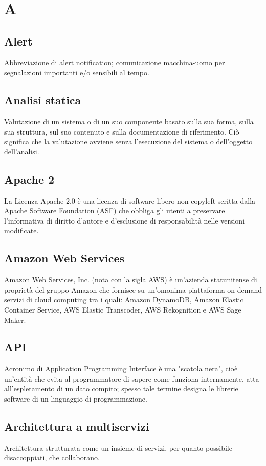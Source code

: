 \section*{A}
\subsection*{Alert}
Abbreviazione di alert notification; comunicazione macchina-uomo per segnalazioni importanti e/o sensibili al tempo.

\subsection*{Analisi statica}
Valutazione di un sistema o di un suo componente basato sulla sua forma, sulla sua struttura, sul suo contenuto e sulla documentazione di riferimento. Ciò significa che la valutazione avviene senza l'esecuzione del sistema o dell'oggetto dell'analisi.

\subsection*{Apache 2}
La Licenza Apache 2.0 è una licenza di software libero non copyleft scritta dalla Apache Software Foundation (ASF) che obbliga gli utenti a preservare l'informativa di diritto d'autore e d'esclusione di responsabilità nelle versioni modificate. 

\subsection*{Amazon Web Services}
Amazon Web Services, Inc. (nota con la sigla AWS) è un'azienda statunitense di proprietà del gruppo Amazon che fornisce su un'omonima piattaforma on demand servizi di cloud computing tra i quali: Amazon DynamoDB, Amazon Elastic Container Service, AWS Elastic Transcoder, AWS Rekognition e AWS Sage Maker.

\subsection*{API}
Acronimo di Application Programming Interface è una "scatola nera", cioè un'entità che evita al programmatore di sapere come funziona internamente, atta all'espletamento di un dato compito; spesso tale termine designa le librerie software di un linguaggio di programmazione.

\subsection*{Architettura a multiservizi}
Architettura strutturata come un insieme di servizi, per quanto possibile disaccoppiati, che collaborano.

